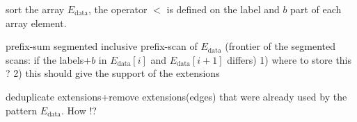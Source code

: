 \begin{algorithm}[!htb]
\begin{algorithmic}[1]
\medskip
     \STATE sort the array $E_{\text{data}}$, the operator $<$ is defined on the
            label and $b$ part of each array element.
\medskip

     \STATE prefix-sum segmented inclusive prefix-scan of $E_{\text{data}}$ (frontier of the
            segmented scans: if the labels+$b$ in $E_{\text{data}}[i]$ and $E_{\text{data}}[i+1]$ differs)
            1) where to store this ? 2) this should give the support of the
            extensions

  \ENDFOR
  \STATE deduplicate extensions+remove extensions(edges) that were already used by the pattern $E_{\text{data}}$. How !?
\end{algorithmic}
\end{algorithm}

